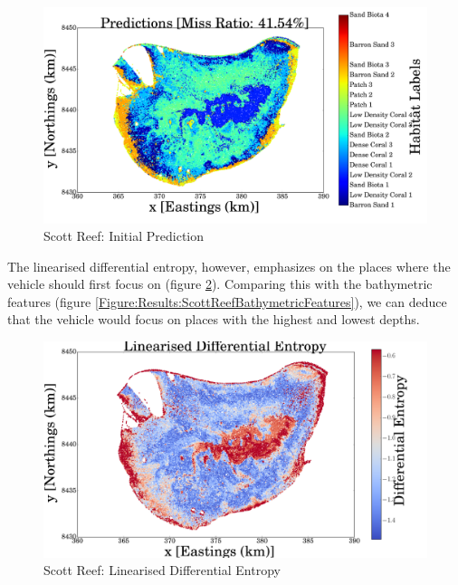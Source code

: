 \documentclass{article}
\begin{document}
		\begin{figure}[t]
		\centering
			\includegraphics[width = \linewidth]{Figures/scott_reef_modeling/Figure8-eps-converted-to.png}
		\caption{Scott Reef: Initial Prediction}
		\label{Figure:Results:ScottReefInitialPredictions}
		\end{figure}
					
		The linearised differential entropy, however, emphasizes on the places where the vehicle should first focus on (figure \ref{Figure:Results:ScottReefLinearisedDifferentialEntropy}). Comparing this with the bathymetric features (figure \ref{Figure:Results:ScottReefBathymetricFeatures}), we can deduce that the vehicle would focus on places with the highest and lowest depths.
		
		\begin{figure}[bp]
		\centering
			\includegraphics[width = \linewidth]{Figures/scott_reef_modeling/Figure11-eps-converted-to.png}
		\caption{Scott Reef: Linearised Differential Entropy}
		\label{Figure:Results:ScottReefLinearisedDifferentialEntropy}
		\end{figure}
	
\end{document}
